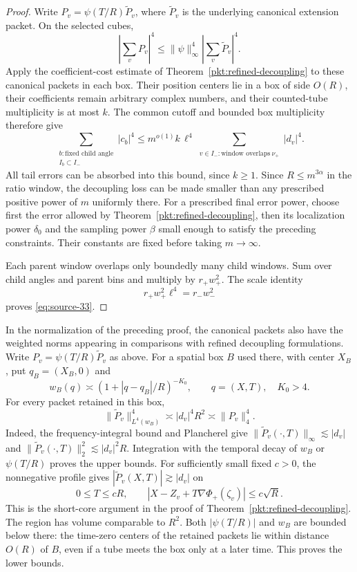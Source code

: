 \begin{proof}
Write
$P_v=\psi(T/R)\widetilde P_v$, where $\widetilde P_v$ is the
underlying canonical extension packet.  On the selected cubes,
\[
 \left|\sum_vP_v\right|^4
   \le \|\psi\|_\infty^4
                  \left|\sum_v\widetilde P_v\right|^4.
\]
Apply the coefficient-cost estimate of
Theorem~\ref{pkt:refined-decoupling} to these canonical packets in
each box.  Their position centers lie in a box of side $O(R)$, their
coefficients remain arbitrary complex numbers, and their counted-tube
multiplicity is at most $k$.  The common cutoff and bounded box
multiplicity therefore give
\[
 \sum_{\substack{b:\text{fixed child angle}\\
                      I_b\subset I_-}}|c_b|^4
     \le m^{o(1)} k\,\ell^4
          \sum_{\substack{v\in I_-:\text{window overlaps}\ \nu_+}}
                         |d_v|^4.
\]
All tail errors can be absorbed into this bound, since $k\ge1$.
Since $R\le m^{3\alpha}$ in the ratio window, the decoupling loss
can be made smaller than any prescribed positive power of $m$
uniformly there.  For a prescribed final error power, choose first the
error allowed by Theorem~\ref{pkt:refined-decoupling}, then its
localization power $\delta_0$ and the sampling power $\beta$ small enough to
satisfy the preceding constraints.
Their constants are fixed before taking $m\to\infty$.

Each parent window overlaps only boundedly many child windows.  Sum
over child angles and parent bins and multiply by $r_+w_+^2$.  The
scale identity
\[
 r_+w_+^2\ell^4=r_-w_-^2
\]
proves \eqref{eq:source-33}.
\end{proof}

\begin{remark}
In the normalization of the preceding proof, the canonical packets
also have the weighted norms appearing in comparisons with refined
decoupling formulations.  Write
$P_v=\psi(T/R)\widetilde P_v$ as above.  For a spatial box $B$ used
there, with center $X_B$, put $q_B=(X_B,0)$ and
\[
 w_B(q)\asymp(1+|q-q_B|/R)^{-K_0},\qquad q=(X,T),\quad K_0>4.
\]
For every packet retained in this box,
\[
 \|\widetilde P_v\|_{L^4(w_B)}^4
       \asymp |d_v|^4R^2
       \asymp \|P_v\|_4^4.
\]
Indeed, the frequency-integral bound and Plancherel give
$\|\widetilde P_v(\cdot,T)\|_\infty\lesssim|d_v|$ and
$\|\widetilde P_v(\cdot,T)\|_2^2\lesssim|d_v|^2R$.
Integration with the temporal decay of $w_B$ or $\psi(T/R)$ proves
the upper bounds.  For sufficiently small fixed $c>0$, the
nonnegative profile gives $|\widetilde P_v(X,T)|\gtrsim|d_v|$ on
\[
 0\le T\le cR,\qquad
 |X-Z_v+T\nabla\Phi_+(\zeta_v)|\le c\sqrt R.
\]
This is the short-core argument in the proof of
Theorem~\ref{pkt:refined-decoupling}.  The region has volume
comparable to $R^2$.  Both $|\psi(T/R)|$ and $w_B$ are bounded below
there: the time-zero centers of the retained packets lie within
distance $O(R)$ of $B$, even if a tube meets the box only at a later
time.  This proves the lower bounds.
\end{remark}

